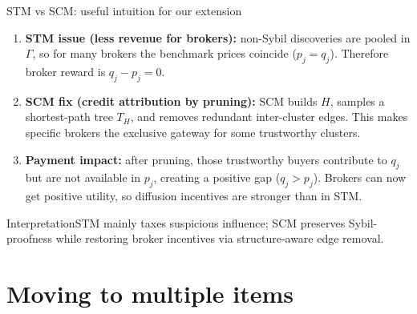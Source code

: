 \documentclass[10pt,aspectratio=169]{beamer}
\newcommand{\greenblock}[2]{\begin{exampleblock}{#1}#2\end{exampleblock}}
\newcommand{\impterm}[1]{\textbf{\color{purple}{#1}}}
\begin{document}
\begin{frame}{STM vs SCM: useful intuition for our extension}

\vspace{1mm}
\begin{enumerate}
  \item \textbf{STM issue (less revenue for brokers):} non-Sybil discoveries are pooled in $\Gamma$, so for many brokers the benchmark prices coincide ($p_j=q_j$). Therefore broker reward is $q_j-p_j=0$.

  \item \textbf{SCM fix (credit attribution by pruning):} SCM builds $H$, samples a shortest-path tree $T_H$, and removes redundant inter-cluster edges. This makes specific brokers the exclusive gateway for some trustworthy clusters.

  \item \textbf{Payment impact:} after pruning, those trustworthy buyers contribute to $q_j$ but are not available in $p_j$, creating a positive gap ($q_j>p_j$). Brokers can now get positive utility, so diffusion incentives are stronger than in STM.
\end{enumerate}

\greenblock{Interpretation}{STM mainly taxes suspicious influence; SCM preserves Sybil-proofness while restoring broker incentives via structure-aware edge removal.}
\end{frame}

\section{Moving to multiple items}
\end{document}
